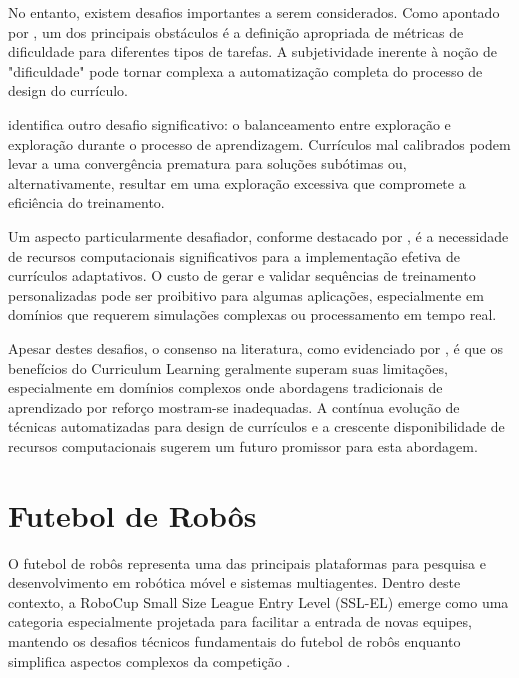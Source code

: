 No entanto, existem desafios importantes a serem considerados. Como apontado por \cite{https://openreview.net/forum?id=anbBFlX1tJ1}, um dos principais obstáculos é a definição apropriada de métricas de dificuldade para diferentes tipos de tarefas. A subjetividade inerente à noção de "dificuldade" pode tornar complexa a automatização completa do processo de design do currículo.

\cite{https://jmlr.org/papers/volume21/20-212/20-212.pdf} identifica outro desafio significativo: o balanceamento entre exploração e exploração durante o processo de aprendizagem. Currículos mal calibrados podem levar a uma convergência prematura para soluções subótimas ou, alternativamente, resultar em uma exploração excessiva que compromete a eficiência do treinamento.

Um aspecto particularmente desafiador, conforme destacado por \cite{https://dl.acm.org/doi/10.1145/3503161.3548549}, é a necessidade de recursos computacionais significativos para a implementação efetiva de currículos adaptativos. O custo de gerar e validar sequências de treinamento personalizadas pode ser proibitivo para algumas aplicações, especialmente em domínios que requerem simulações complexas ou processamento em tempo real.

Apesar destes desafios, o consenso na literatura, como evidenciado por \cite{https://arxiv.org/abs/2101.10382}, é que os benefícios do Curriculum Learning geralmente superam suas limitações, especialmente em domínios complexos onde abordagens tradicionais de aprendizado por reforço mostram-se inadequadas. A contínua evolução de técnicas automatizadas para design de currículos e a crescente disponibilidade de recursos computacionais sugerem um futuro promissor para esta abordagem.

\section{Futebol de Robôs}
\label{sec:futebol_robos}

O futebol de robôs representa uma das principais plataformas para pesquisa e desenvolvimento em robótica móvel e sistemas multiagentes. Dentro deste contexto, a RoboCup Small Size League Entry Level (SSL-EL) emerge como uma categoria especialmente projetada para facilitar a entrada de novas equipes, mantendo os desafios técnicos fundamentais do futebol de robôs enquanto simplifica aspectos complexos da competição \cite{https://robocup-ssl.github.io/ssl-rules/sslrules.html}.

